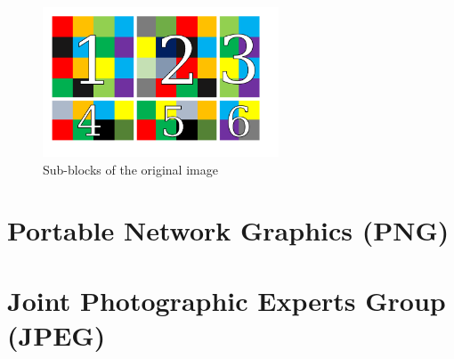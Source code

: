 \begin{multicols*}{2}
\begin{figure}[H]
    \centering
    \includegraphics[width=7cm,keepaspectratio]{pics/bmp_scrambling/image_broken_subblocks}
    \caption{Sub-blocks of the original image}
    \label{scramble_example_subblocks}
\end{figure}

\section{Portable Network Graphics (PNG)} \label{PNG_Explained_Chapter}

\section{Joint Photographic Experts Group (JPEG)} \label{JPEG_Explained_Chapter}
\end{multicols*}
